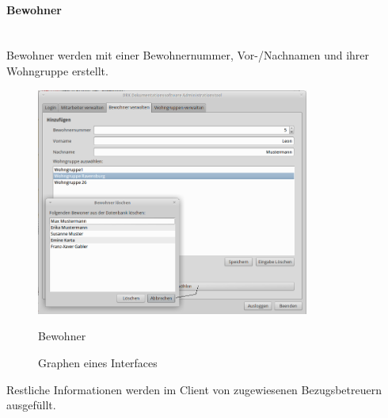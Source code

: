 \paragraph{Bewohner}\mbox{}\\
Bewohner werden mit einer Bewohnernummer, Vor-/Nachnamen und ihrer Wohngruppe  erstellt. 
\begin{figure}[h]
	\begin{center}
		\includegraphics[keepaspectratio=true, width=0.8\textwidth]{pics/admin2.png}
		\caption{Bewohner}
		\label{Admindialog Bewohner}
		\caption{Graphen eines Interfaces}
		\label{Admindialog_Bewohner}
	\end{center}
\end{figure}
\FloatBarrier
\noindent
Restliche Informationen werden im Client von zugewiesenen Bezugsbetreuern ausgefüllt.
\newpage
\noindent
